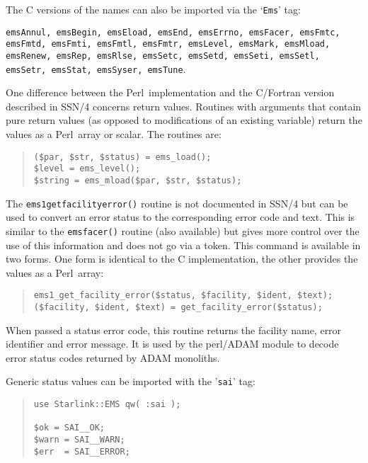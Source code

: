\documentclass[twoside,11pt]{article}
\newenvironment{myquote}{\begin{quote}\begin{small}}{\end{small}\end{quote}}
\newcommand{\perl}{\xref{\textsf{Perl}}{sun193}{}}
\newcommand{\xref}[3]{#1}
\renewcommand{\_}{\texttt{\symbol{95}}}
\begin{document}
The C versions of the names can also be imported via the `\texttt{Ems}'
tag:

\texttt{emsAnnul, emsBegin, emsEload, emsEnd, emsErrno, emsFacer,
emsFmtc, emsFmtd, emsFmti, emsFmtl, emsFmtr, emsLevel, emsMark, emsMload,
emsRenew, emsRep, emsRlse, emsSetc, emsSetd, emsSeti, emsSetl,
emsSetr, emsStat, emsSyser, emsTune}.

One difference between the \perl\ implementation and the C/Fortran version
described in \xref{SSN/4}{ssn4}{} concerns return values. Routines with
arguments that contain pure return values (as opposed to
modifications of an existing variable) return the values as
a \perl\ array or scalar. The routines are:

\begin{myquote}
\begin{verbatim}
($par, $str, $status) = ems_load();
$level = ems_level();
$string = ems_mload($par, $str, $status);
\end{verbatim}
\end{myquote}

The \texttt{ems1\_get\_facility\_error()} routine is not documented in
\xref{SSN/4}{ssn4}{} but can be used to convert an error status to the
corresponding error code and text. This is similar to the
\texttt{ems\_facer()} routine (also available) but gives more control over the
use of this information and does not go via a token.  This command is
available in two forms. One form is identical to the C implementation, the
other provides the values as a \perl\ array:

\begin{myquote}
\begin{verbatim}
ems1_get_facility_error($status, $facility, $ident, $text);
($facility, $ident, $text) = get_facility_error($status);
\end{verbatim}
\end{myquote}

When passed a status error code, this routine returns the facility
name, error identifier and error message. It is used by the perl/ADAM
module to decode error status codes returned by ADAM monoliths.

Generic status values can be imported with the '\texttt{sai}' tag:

\begin{myquote}
\begin{verbatim}
use Starlink::EMS qw( :sai );

$ok = SAI__OK;
$warn = SAI__WARN;
$err  = SAI__ERROR;
\end{verbatim}
\end{myquote}
\end{document}
